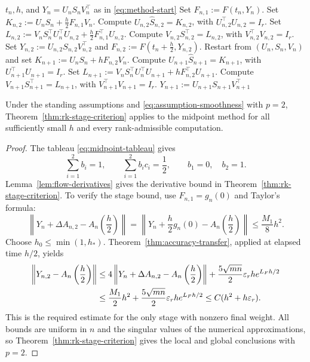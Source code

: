 \documentclass[]{article}
\numberwithin{equation}{section}
\theoremstyle{plain}
\theoremstyle{remark}
\numberwithin{algorithm}{section}
\newcommand{\eps}{\varepsilon}
\begin{document}
\begin{algorithm}[htbp]
\caption{One step of the projector-splitting explicit midpoint method.}
\label{alg:midpoint}
\begin{algorithmic}[1]
\Require \(t_n,h\), and \(Y_n=U_nS_nV_n^\top\) as in
\eqref{eq:method-start}
\State Set \(F_{n,1}:=F(t_n,Y_n)\).
\State Set \(K_{n,2}:=U_nS_n+\frac h2F_{n,1}V_n\).
\State Compute \(U_{n,2}\widehat S_{n,2}=K_{n,2}\), with
\(U_{n,2}^\top U_{n,2}=I_r\).
\State Set
\(L_{n,2}:=V_nS_n^\top U_n^\top U_{n,2}
+\frac h2F_{n,1}^\top U_{n,2}\).
\State Compute \(V_{n,2}S_{n,2}^\top=L_{n,2}\), with
\(V_{n,2}^\top V_{n,2}=I_r\).
\State Set \(Y_{n,2}:=U_{n,2}S_{n,2}V_{n,2}^\top\) and
\(F_{n,2}:=F(t_n+\frac h2,Y_{n,2})\).
\State Restart from \((U_n,S_n,V_n)\) and set
\(K_{n+1}:=U_nS_n+hF_{n,2}V_n\).
\State Compute \(U_{n+1}\widehat S_{n+1}=K_{n+1}\), with
\(U_{n+1}^\top U_{n+1}=I_r\).
\State Set
\(L_{n+1}:=V_nS_n^\top U_n^\top U_{n+1}
+hF_{n,2}^\top U_{n+1}\).
\State Compute \(V_{n+1}S_{n+1}^\top=L_{n+1}\), with
\(V_{n+1}^\top V_{n+1}=I_r\).
\Ensure \(Y_{n+1}:=U_{n+1}S_{n+1}V_{n+1}^\top\)
\end{algorithmic}
\end{algorithm}
\FloatBarrier

Under the standing assumptions and \eqref{eq:assumption-smoothness}
with \(p=2\), Theorem~\ref{thm:rk-stage-criterion} applies to the midpoint
method for all sufficiently small \(h\) and every rank-admissible
computation.

\begin{proof}
The tableau \eqref{eq:midpoint-tableau} gives
\begin{equation}\label{eq:midpoint-moments}
 \sum_{i=1}^{2}b_i=1,\qquad
 \sum_{i=1}^{2}b_ic_i=\frac12,\qquad b_1=0,\quad b_2=1.
\end{equation}
Lemma~\ref{lem:flow-derivatives} gives the derivative bound in
Theorem~\ref{thm:rk-stage-criterion}.  To verify the stage bound, use
\(F_{n,1}=g_n(0)\) and Taylor's formula:
\begin{equation}\label{eq:midpoint-euler-error}
 \left\|Y_n+\Delta A_{n,2}-A_n\left(\frac h2\right)\right\|
 =\left\|Y_n+\frac h2g_n(0)-A_n\left(\frac h2\right)\right\|
 \le\frac{M_1}{8}h^2.
\end{equation}
Choose \(h_0\le\min(1,h_*)\).  Theorem~\ref{thm:accuracy-transfer},
applied at elapsed time \(h/2\), yields
\begin{align}\label{eq:midpoint-stage-error}
 \left\|Y_{n,2}-A_n\left(\frac h2\right)\right\|
 &\le4\left\|Y_n+\Delta A_{n,2}-A_n\left(\frac h2\right)\right\|
    +\frac{5\sqrt{mn}}2\eps_rh e^{L_Fh/2}\notag\\
 &\le\frac{M_1}{2}h^2+\frac{5\sqrt{mn}}2\eps_rh e^{L_Fh/2}
 \le C(h^2+h\eps_r).
\end{align}
This is the required estimate for the only stage with nonzero final
weight.  All bounds are uniform in \(n\) and the singular values of the
numerical approximations, so Theorem~\ref{thm:rk-stage-criterion} gives the local and global
conclusions with \(p=2\).
\end{proof}
\end{document}

